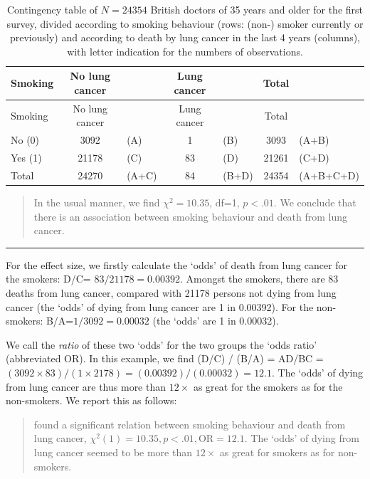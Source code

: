 \documentclass[
]{book}
\begin{document}
\begin{longtable}[]{@{}lclclcl@{}}
\caption{\label{tab:dollhill} Contingency table of \(N=24354\) British doctors of 35 years
and older for the first survey, divided according to smoking behaviour (rows: (non-)
smoker currently or previously) and according to death by lung cancer in the last
4 years (columns), with letter indication for the numbers
of observations.}\tabularnewline
\toprule\noalign{}
Smoking & No lung cancer & & Lung cancer & & Total & \\
\midrule\noalign{}
\endfirsthead
\toprule\noalign{}
Smoking & No lung cancer & & Lung cancer & & Total & \\
\midrule\noalign{}
\endhead
\bottomrule\noalign{}
\endlastfoot
No (0) & 3092 & (A) & 1 & (B) & 3093 & (A+B) \\
Yes (1) & 21178 & (C) & 83 & (D) & 21261 & (C+D) \\
Total & 24270 & (A+C) & 84 & (B+D) & 24354 & (A+B+C+D) \\
\end{longtable}

\begin{quote}
In the usual manner, we find \(\chi^2=10.35\), df=1, \(p<.01\). We conclude that
there is an association between smoking behaviour and death from lung cancer.
\end{quote}

\begin{center}\rule{0.5\linewidth}{0.5pt}\end{center}

For the effect size, we firstly calculate the `odds' of death from
lung cancer for the smokers: D/C= \(83/21178 =0.00392\). Amongst the smokers,
there are 83 deaths from lung cancer, compared with 21178
persons not dying from lung cancer (the `odds' of dying from
lung cancer are 1 in 0.00392). For the non-smokers:
B/A=\(1/3092 =0.00032\) (the `odds' are 1 in 0.00032).

We call the \emph{ratio} of these two `odds' for the two groups the
`odds ratio' (abbreviated OR). In this example, we find (D/C) / (B/A) =
AD/BC =
\((3092 \times 83) / (1 \times 2178) = (0.00392)/(0.00032) = 12.1\). The
`odds' of dying from lung cancer are thus more than \(12\times\)
as great for the smokers as for the non-smokers. We report this as follows:

\begin{quote}
\citet{DollHill1956} found a significant relation between
smoking behaviour and death from lung cancer,
\(\chi^2(1)=10.35, p<.01, \textrm{OR}=12.1\). The `odds' of dying from
lung cancer seemed to be more than \(12\times\) as great for smokers as for
non-smokers.
\end{quote}
\end{document}
